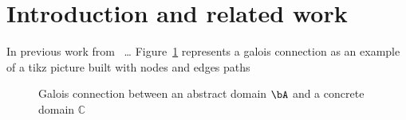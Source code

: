 \section{Introduction and related work}\label{sec:one}

In previous work from~\cite{patrickradiha:one} \dots
Figure~\ref{fig:one} represents a galois connection as an example of a
tikz picture built with nodes and edges paths

\begin{figure}
  \centering
  \usetikzlibrary{arrows.meta}  %
  \caption{Galois connection between an abstract domain \(\bA\) and a
    concrete domain \(\mathbb{C}\)}\label{fig:one}
\end{figure}